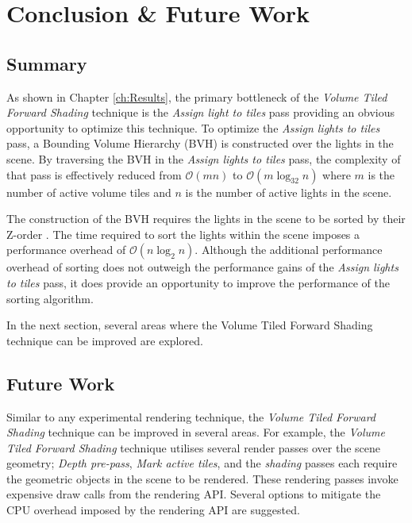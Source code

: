 \chapter{Conclusion \& Future Work} %
\label{ch:Conclustion}

\section{Summary}

As shown in Chapter \ref{ch:Results}, the primary bottleneck of the \emph{Volume Tiled Forward Shading} technique is the \emph{Assign light to tiles} pass providing an obvious opportunity to optimize this technique. To optimize the \emph{Assign lights to tiles} pass, a Bounding Volume Hierarchy (BVH) is constructed over the lights in the scene. By traversing the BVH in the \emph{Assign lights to tiles} pass, the complexity of that pass is effectively reduced from $\mathcal{O}(mn)$ to $\mathcal{O}(m\log_{32}n)$ where $m$ is the number of active volume tiles and $n$ is the number of active lights in the scene.

The construction of the BVH requires the lights in the scene to be sorted by their Z-order \parencite{31_dickau_2008}. The time required to sort the lights within the scene imposes a performance overhead of $\mathcal{O}(n\log_{2}n)$. Although the additional performance overhead of sorting does not outweigh the performance gains of the \emph{Assign lights to tiles} pass, it does provide an opportunity to improve the performance of the sorting algorithm.

In the next section, several areas where the Volume Tiled Forward Shading technique can be improved are explored.

\section{Future Work}

Similar to any experimental rendering technique, the \emph{Volume Tiled Forward Shading} technique can be improved in several areas. For example, the \emph{Volume Tiled Forward Shading} technique utilises several render passes over the scene geometry; \emph{Depth pre-pass}, \emph{Mark active tiles}, and the \emph{shading} passes each require the geometric objects in the scene to be rendered. These rendering passes invoke expensive draw calls from the rendering API. Several options to mitigate the CPU overhead imposed by the rendering API are suggested.

